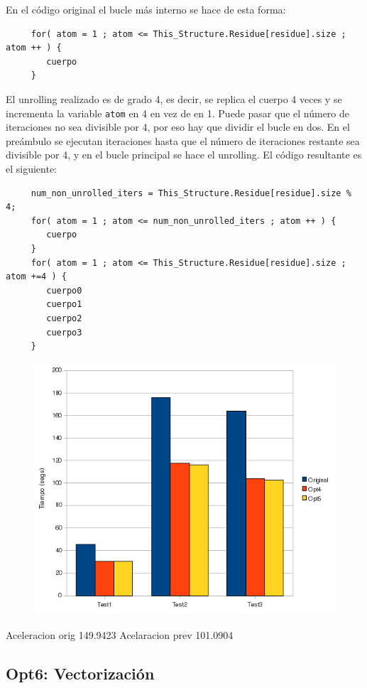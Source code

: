 En el c\'{o}digo original el bucle m\'{a}s interno se hace de esta forma:

\begin{lstlisting}
     for( atom = 1 ; atom <= This_Structure.Residue[residue].size ; atom ++ ) {
        cuerpo
     }
\end{lstlisting}

El unrolling realizado es de grado 4, es decir, se replica el cuerpo 4 veces y
se incrementa la variable \texttt{atom} en 4 en vez de en 1. Puede pasar que el
n\'{u}mero de iteraciones no sea divisible por 4, por eso hay que dividir el
bucle en dos. En el pre\'{a}mbulo se ejecutan iteraciones hasta que el
n\'{u}mero de iteraciones restante sea divisible por 4, y en el bucle principal
se hace el unrolling. El c\'{o}digo resultante es el siguiente:

\begin{lstlisting}
     num_non_unrolled_iters = This_Structure.Residue[residue].size % 4;
     for( atom = 1 ; atom <= num_non_unrolled_iters ; atom ++ ) {
        cuerpo
     }
     for( atom = 1 ; atom <= This_Structure.Residue[residue].size ; atom +=4 ) {
        cuerpo0
        cuerpo1
        cuerpo2
        cuerpo3
     }
\end{lstlisting}

\begin{figure}[ht]
   \centering
   \includegraphics[keepaspectratio=true,width=.6\textwidth]{figures/opt5-perf}
\end{figure}

Aceleracion orig	149.9423%
Acelaracion prev	101.0904%

\subsection{Opt6: Vectorizaci\'{o}n}

